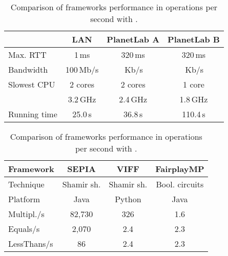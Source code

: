 \documentclass[letterpaper,11pt,onecolumn,titlepage]{article}
\begin{document}
\begin{table}[t]
	\centering
	\begin{minipage}{0.49\textwidth}
		\vspace{0pt}
		\centering
		\begin{small}
		\setlength{\tabcolsep}{3pt}
		\begin{tabular}{p{1.9cm}|ccc}
										 & LAN  	 					& PlanetLab A  					& PlanetLab B \\
			\hline
			Max. RTT 			 & 1\,ms  					&  320\,ms    					& 320\,ms    \\
			Bandwidth		   & 100\,Mb/s  	  	&  \,Kb/s 	  & \,Kb/s  \\
			Slowest CPU 	 & 2 cores        	&  2 cores            	& 1 core  	  \\
										 & 3.2\,GHz         &  2.4\,GHz						  & 1.8\,GHz  \\
 		  Running time 	 & 25.0\,s  				&  36.8\,s    					& 110.4\,s   \\
		\end{tabular}
		\end{small}
		\caption{Comparison of LAN and PlanetLab settings.}
		\label{tab:planetlab}
	\end{minipage}
	\hfill
	\begin{minipage}{0.49\textwidth}
		\centering
		\begin{small}
		\setlength{\tabcolsep}{3pt}
		\begin{tabular}{p{1.7cm}|ccc}
			Framework       &  SEPIA         &  VIFF  				& FairplayMP \\
			\hline
			Technique			  &  Shamir sh. & Shamir sh.  & Bool. circuits  \\	      
			Platform				&  Java       & Python      &   Java          \\       
			Multipl./s      &  82,730       &    326    	&    1.6     \\
			Equals/s  	&   2,070 	&     2.4   	&    2.3     \\
			LessThans/s    	&     86   &     2.4       &    2.3     \\
		\end{tabular}
		\end{small}
		\caption{Comparison of frameworks performance in operations per second with . }
		\label{tab:frameworks}
	\end{minipage}
\end{table}
\end{document}
